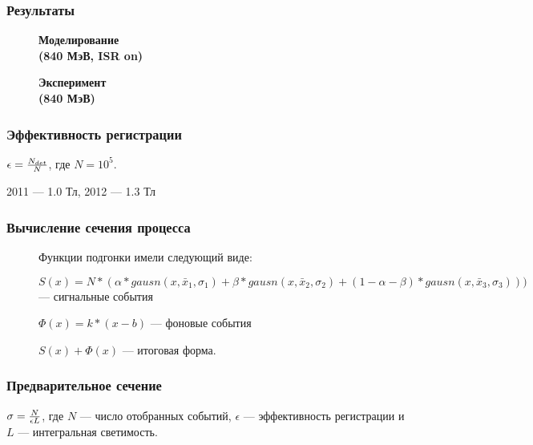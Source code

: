 \documentclass[14pt, hyperref = {colorlinks}]{beamer}
\begin{document}
\begin{frame}\label{r2}
\frametitle{Результаты}
\begin{figure}[h]
  \begin{minipage}[h]{0.49\linewidth}
    \center\textbf{Моделирование \\(840 МэВ, ISR on)}
  \end{minipage}
  \hfill
  \begin{minipage}[h]{0.49\linewidth}
    \center\textbf{Эксперимент \\(840 МэВ)}
  \end{minipage}
\end{figure}
\end{frame}

\begin{frame}
\frametitle{Эффективность регистрации}
\center $\epsilon = {N_{det}\over{N}}$, где $N=10^{5}$.

2011 --- 1.0 Тл, 2012 --- 1.3 Тл
\begin{figure}[h]
\end{figure}
\end{frame}

\begin{frame}
\frametitle{Вычисление сечения процесса}
\begin{figure}[h]

    Функции подгонки имели следующий виде:
    \begin{itemize}
    \tiny{
    \item $S(x) = N*(\alpha*gausn(x, \bar{x}_{1}, \sigma_{1}) + \beta*gausn(x, \bar{x}_{2}, \sigma_{2}) + (1-\alpha-\beta)*gausn(x, \bar{x}_{3}, \sigma_{3})))$ --- сигнальные события
    \item $\Phi(x) = k*(x-b)$ --- фоновые события
    \item $S(x) + \Phi(x)$ --- итоговая форма. 
    }
    \end{itemize}
\end{figure}
\end{frame}

\begin{frame}
\frametitle{Предварительное сечение}
\center $\sigma = {N\over{\epsilon L}}$, где $N$ --- число отобранных событий, $\epsilon$ --- эффективность регистрации и $L$ --- интегральная светимость.\\
\begin{figure}[h]
    \center\textbf{}
\end{figure}
\end{frame}
\end{document}

